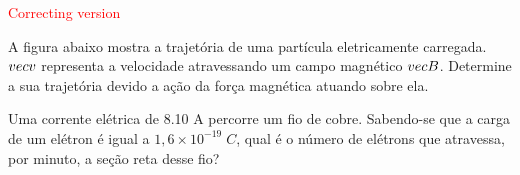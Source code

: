 \documentclass[12pt, addpoints]{exam}
\begin{document}
        \begin{center}
\textcolor{red}{\emph\Large Correcting version}\end{center}
\begin{questions}
\begin{multicols*}{2}
\question[20] A ﬁgura abaixo mostra a trajetória de uma partícula eletricamente carregada. $\\vec{{v}}$ representa a velocidade atravessando um campo magnético $\\vec{{B}}$. Determine a sua trajetória devido a ação da força magnética atuando sobre ela.
        
        \begin{center}
            \begin{minipage}[c]{0.5\linewidth}
            \end{minipage}
        \end{center}

        

\begin{oneparchoices}
\end{oneparchoices}
\question[20] Uma corrente elétrica de    8.10 A percorre um ﬁo de cobre. Sabendo-se que a carga de um elétron é igual a $1,6\times 10^{-19}\;C$, qual é o número de elétrons que atravessa, por minuto, a seção reta desse ﬁo?


\end{multicols*}
\end{questions}
\end{document}
